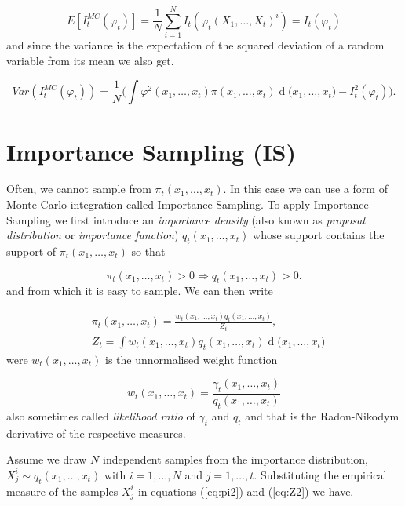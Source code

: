\documentclass[11pt,a4paper]{article}
\renewcommand{\d}[1]{\ensuremath{\operatorname{d}\!{#1}}}
\begin{document}
\begin{equation*}
    E[I^{MC}_t(\varphi_t)] = \frac{1}{N} \sum_{i=1}^N I_t(\varphi_t(X_1, \dots, X_t)^i) = I_t(\varphi_t)
\end{equation*}
and since the variance is the expectation of the squared deviation of a random variable from its mean we also get.

\begin{equation*}
    Var(I^{MC}_t(\varphi_t)) = \frac{1}{N} \bigg( \int \varphi^2(x_1, \dots, x_t) \pi(x_1, \dots, x_t) \d (x_1, \dots, x_t) - I^2_t(\varphi_t)\bigg).
\end{equation*}

\section{Importance Sampling (IS)}

Often, we cannot sample from $\pi_t (x_1, \dots, x_t)$. In this case we can use a form of Monte Carlo integration called Importance Sampling. To apply Importance Sampling we first introduce an \textit{importance density} (also known as \textit{proposal distribution} or \textit{importance function}) $q_t(x_1, \dots, x_t)$ whose support contains the support of $\pi_t (x_1, \dots, x_t)$ so that

\begin{equation*}
    \pi_t(x_1, \dots, x_t) > 0 \Rightarrow q_t(x_1, \dots, x_t) > 0.
\end{equation*}
and from which it is easy to sample. We can then write

\begin{align} \label{eq:pi2}
    &\pi_t(x_1, \dots, x_t) = \frac{w_t(x_1, \dots, x_t)q_t(x_1, \dots, x_t)}{Z_t}, \\
    &Z_t = \int w_t(x_1, \dots, x_t)q_t(x_1, \dots, x_t) \d (x_1, \dots, x_t) \label{eq:Z2}
\end{align}
were $w_t(x_1, \dots, x_t)$ is the unnormalised weight function

\begin{equation}
    w_t(x_1, \dots, x_t) = \frac{\gamma_t(x_1, \dots, x_t)}{q_t(x_1, \dots, x_t)}
\end{equation}
also sometimes called \textit{likelihood ratio} of $\gamma_t$ and $q_t$ and that is the Radon-Nikodym derivative of the respective measures.

Assume we draw $N$ independent samples from the importance distribution, $X^i_j \sim q_t(x_1, \dots, x_t)$ with $i = 1, \dots, N$ and $j = 1, \dots, t$. Substituting the empirical measure of the samples $X^i_j$ in equations (\ref{eq:pi2}) and (\ref{eq:Z2}) we have.
\end{document}

